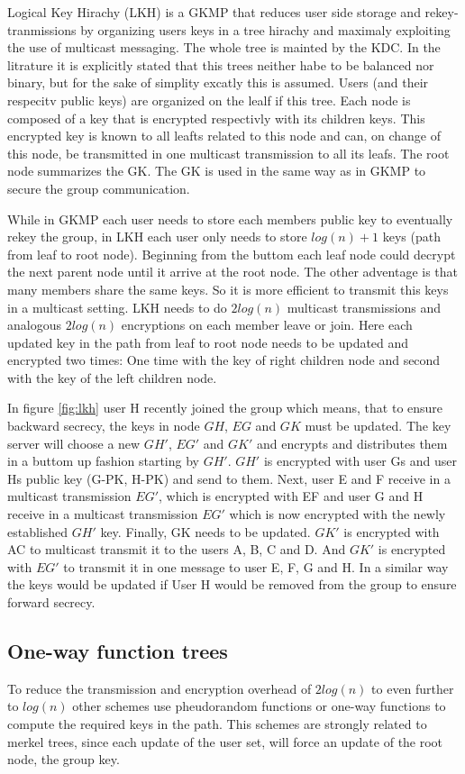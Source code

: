 Logical Key Hirachy (LKH)\cite{wallner1999key} is a GKMP that reduces user side storage and rekey-tranmissions by organizing users keys in a tree hirachy and maximaly exploiting the use of multicast messaging. The whole tree is mainted by the KDC. In the litrature it is explicitly stated that this trees neither habe to be balanced nor binary, but for the sake of simplity excatly this is assumed. Users (and their respecitv public keys) are organized on the lealf if this tree. Each node is composed of a key that is encrypted respectivly with its children keys. This encrypted key is known to all leafts related to this node and can, on change of this node, be transmitted in one multicast transmission to all its leafs. The root node summarizes the GK. The GK is used in the same way as in GKMP to secure the group communication. 

While in GKMP each user needs to store each members public key to eventually rekey the group, in LKH each user only needs to store $log(n) +1$ keys (path from leaf to root node). Beginning from the buttom each leaf node could decrypt the next parent node until it arrive at the root node. The other adventage is that many members share the same keys. So it is more efficient to transmit this keys in a multicast setting. LKH needs to do $2log(n)$ multicast transmissions and analogous $2log(n)$ encryptions on each member leave or join.  Here each updated key in the path from leaf to root node needs to be updated and encrypted two times: One time with the key of right children node and second with the key of the left children node. 

In figure \ref{fig:lkh} user H recently joined the group which means, that to ensure backward secrecy, the keys in node $GH$, $EG$ and $GK$ must be updated. The key server will choose a new $GH'$, $EG'$ and $GK'$ and encrypts and distributes them in a buttom up fashion starting by $GH'$. $GH'$ is encrypted with user Gs and user Hs public key (G-PK, H-PK) and send to them. Next, user E and F receive in a multicast transmission $EG'$, which is encrypted with EF and user G and H receive in a multicast transmission $EG'$ which is now encrypted with the newly established $GH'$ key. Finally, GK needs to be updated. $GK'$ is encrypted with AC to multicast transmit it to the users A, B, C and D. And $GK'$ is encrypted with $EG'$ to transmit it in one message to user E, F, G and H. In a similar way the keys would be updated if User H would be removed from the group to ensure forward secrecy.   


\subsection{One-way function trees}
To reduce the transmission and encryption overhead of $2log(n)$ to even further to $log(n)$ other schemes use pheudorandom functions \cite{canetti1999multicast} or one-way functions \cite{sherman2003key} to compute the required keys in the path. This schemes are strongly related to merkel trees, since each update of the user set, will force an update of the root node, the group key.

